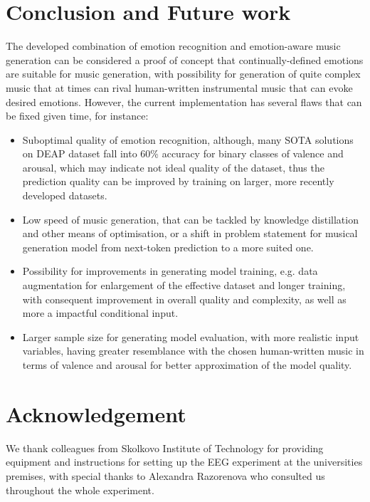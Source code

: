 \documentclass[14pt]{extreport}
\begin{document}
\section{Conclusion and Future work}
The developed combination of emotion recognition and emotion-aware music generation can be considered a proof of concept that continually-defined emotions are suitable for music generation, with possibility for generation of quite complex music that at times can rival human-written instrumental music that can evoke desired emotions. However, the current implementation has several flaws that can be fixed given time, for instance:
\begin{itemize}
 \item Suboptimal quality of emotion recognition, although, many SOTA solutions on DEAP dataset fall into 60\% accuracy for binary classes of \gls{valence} and \gls{arousal}, which may indicate not ideal quality of the dataset, thus the prediction quality can be improved by training on larger, more recently developed datasets.
 
 \item Low speed of music generation, that can be tackled by knowledge distillation and other means of optimisation, or a shift in problem statement for musical generation model from next-token prediction to a more suited one.
 
 \item Possibility for improvements in generating model training, e.g. data augmentation for enlargement of the effective dataset and longer training, with consequent improvement in overall quality and complexity, as well as more a impactful conditional input.
 
 \item Larger sample size for generating model evaluation, with more realistic input variables, having greater resemblance with the chosen human-written music in terms of \gls{valence} and \gls{arousal} for better approximation of the model quality.
\end{itemize}

\section{Acknowledgement}
We thank colleagues from Skolkovo Institute of Technology for providing equipment and instructions for setting up the EEG experiment at the universities premises, with special thanks to Alexandra Razorenova who consulted us throughout the whole experiment. 
\end{document}
